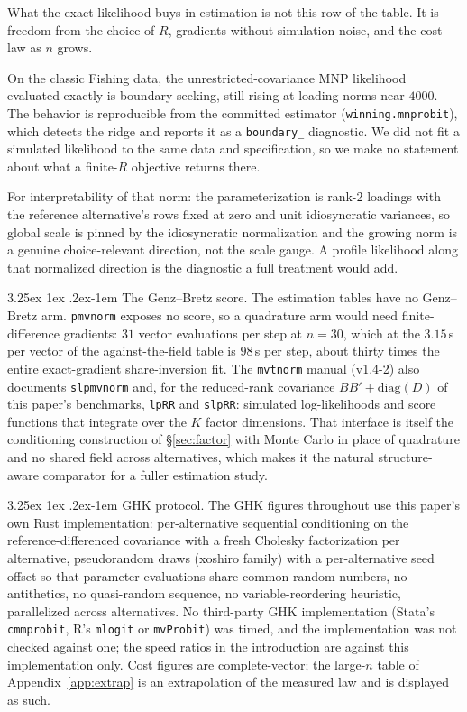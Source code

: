 \documentclass[11pt]{article}
\makeatletter
\renewcommand\paragraph{\@startsection{paragraph}{4}{\z@}%
  {3.25ex \@plus1ex \@minus.2ex}{-1em}%
  {\normalfont\normalsize\itshape}}
\makeatother
\begin{document}
What the exact likelihood buys in estimation is not this row of the
table. It is freedom from the choice of $R$, gradients without simulation
noise, and the cost law as $n$ grows.

On the classic Fishing data, the
unrestricted-covariance MNP likelihood evaluated exactly is
boundary-seeking, still rising at loading norms near $4000$. The behavior is
reproducible from the committed estimator (\texttt{winning.mnprobit}),
which detects the ridge and reports it as a \texttt{boundary\_}
diagnostic. We did not fit a simulated likelihood to the same data and
specification, so we make no statement about what a finite-$R$ objective
returns there.

For interpretability of that norm: the parameterization is rank-2
loadings with the reference alternative's rows fixed at zero and unit
idiosyncratic variances, so global scale is pinned by the idiosyncratic
normalization and the growing norm is a genuine choice-relevant
direction, not the scale gauge. A profile likelihood along that
normalized direction is the diagnostic a full treatment would add.

\paragraph{The Genz--Bretz score.} The estimation tables have no
Genz--Bretz arm. \texttt{pmvnorm} exposes no score, so a quadrature arm
would need finite-difference gradients: $31$ vector evaluations per step
at $n=30$, which at the $3.15$\,s per vector of the against-the-field
table is $98$\,s per step, about thirty times the entire
exact-gradient share-inversion fit. The \texttt{mvtnorm} manual (v1.4-2)
also documents \texttt{slpmvnorm} and, for the reduced-rank covariance
$BB'+\mathrm{diag}(D)$ of this paper's benchmarks, \texttt{lpRR} and
\texttt{slpRR}: simulated log-likelihoods and score functions that
integrate over the $K$ factor dimensions. That interface is itself the
conditioning construction of \S\ref{sec:factor} with Monte Carlo in place
of quadrature and no shared field across alternatives, which makes it the
natural structure-aware comparator for a fuller estimation study.

\paragraph{GHK protocol.} The GHK figures throughout use this paper's own
Rust implementation: per-alternative sequential conditioning on the
reference-differenced covariance with a fresh Cholesky factorization per
alternative, pseudorandom draws (xoshiro family) with a per-alternative
seed offset so that parameter evaluations share common random numbers, no
antithetics, no quasi-random sequence, no variable-reordering heuristic,
parallelized across alternatives. No third-party GHK implementation
(Stata's \texttt{cmmprobit}, R's \texttt{mlogit} or \texttt{mvProbit})
was timed, and the implementation was not checked against one; the
speed ratios in the introduction are against this
implementation only. Cost figures are complete-vector; the
large-$n$ table of Appendix~\ref{app:extrap} is an extrapolation of the measured
law and is displayed as such.
\end{document}
